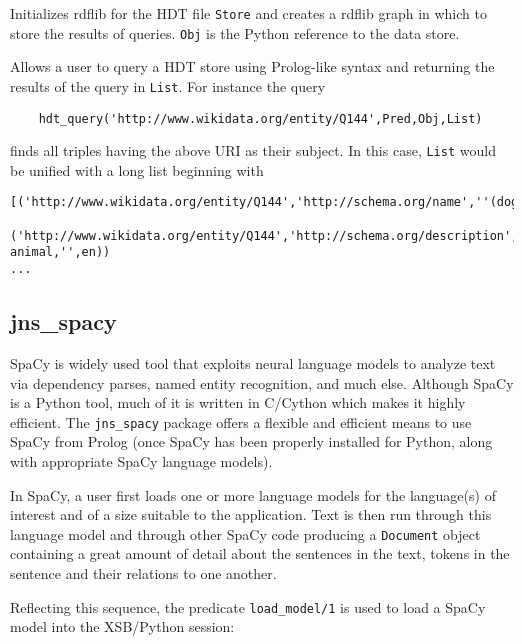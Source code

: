 \begin{description}
  Initializes rdflib for the HDT file {\tt Store} and creates a rdflib
  graph in which to store the results of queries.  {\tt Obj} is the
  Python reference to the data store.
  

  Allows a user to query a HDT store using Prolog-like syntax and
  returning the results of the query in {\tt List}.  For instance the query
\begin{verbatim}
    hdt_query('http://www.wikidata.org/entity/Q144',Pred,Obj,List)
\end{verbatim}
finds all triples having the above URI as their subject.  In this
case, {\tt List} would be unified with a long list beginning with
\begin{footnotesize}
\begin{verbatim}
[('http://www.wikidata.org/entity/Q144','http://schema.org/name',''(dog,'',en))
 ('http://www.wikidata.org/entity/Q144','http://schema.org/description',''('domestic animal,'',en))
...
\end{verbatim}
\end{footnotesize}
\end{description}

\subsection{jns\_spacy}
SpaCy is widely used tool that exploits neural language models to
analyze text via dependency parses, named entity recognition, and much
else.  Although SpaCy is a Python tool, much of it is written in
C/Cython which makes it highly efficient.  The {\tt jns\_spacy} package
offers a flexible and efficient means to use SpaCy from Prolog (once
SpaCy has been properly installed for Python, along with appropriate
SpaCy language models).

In SpaCy, a user first loads one or more language models for the
language(s) of interest and of a size suitable to the application.
Text is then run through this language model and through other SpaCy
code producing a {\tt Document} object containing a great amount of
detail about the sentences in the text, tokens in the sentence and
their relations to one another.

Reflecting this sequence, the predicate {\tt load\_model/1} is used to
load a SpaCy model into the XSB/Python session:

